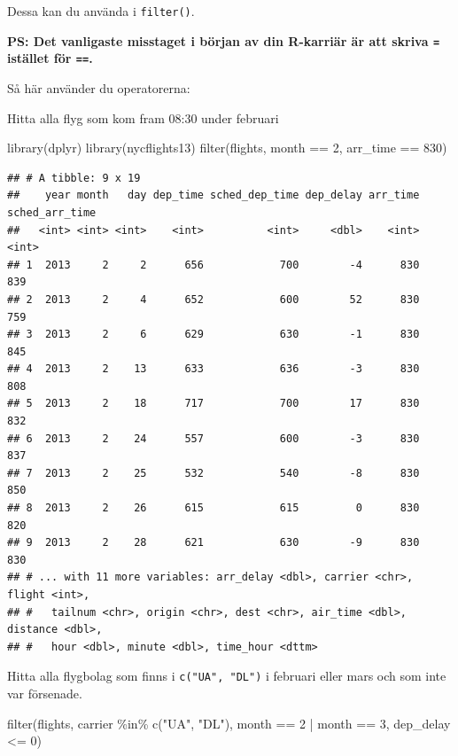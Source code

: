 \documentclass[
]{book}
\newenvironment{Shaded}{\begin{snugshade}}{\end{snugshade}}
\newcommand{\DecValTok}[1]{\textcolor[rgb]{0.00,0.00,0.81}{#1}}
\newcommand{\FunctionTok}[1]{\textcolor[rgb]{0.00,0.00,0.00}{#1}}
\newcommand{\NormalTok}[1]{#1}
\newcommand{\SpecialCharTok}[1]{\textcolor[rgb]{0.00,0.00,0.00}{#1}}
\newcommand{\StringTok}[1]{\textcolor[rgb]{0.31,0.60,0.02}{#1}}
\begin{document}
Dessa kan du använda i \texttt{filter()}.

\textbf{PS: Det vanligaste misstaget i början av din R-karriär är att skriva \texttt{=} istället för \texttt{==}.}

Så här använder du operatorerna:

Hitta alla flyg som kom fram 08:30 under februari

\begin{Shaded}
\begin{Highlighting}[]
\FunctionTok{library}\NormalTok{(dplyr)}
\FunctionTok{library}\NormalTok{(nycflights13)}
\FunctionTok{filter}\NormalTok{(flights, month }\SpecialCharTok{==} \DecValTok{2}\NormalTok{, arr\_time }\SpecialCharTok{==} \DecValTok{830}\NormalTok{)}
\end{Highlighting}
\end{Shaded}

\begin{verbatim}
## # A tibble: 9 x 19
##    year month   day dep_time sched_dep_time dep_delay arr_time sched_arr_time
##   <int> <int> <int>    <int>          <int>     <dbl>    <int>          <int>
## 1  2013     2     2      656            700        -4      830            839
## 2  2013     2     4      652            600        52      830            759
## 3  2013     2     6      629            630        -1      830            845
## 4  2013     2    13      633            636        -3      830            808
## 5  2013     2    18      717            700        17      830            832
## 6  2013     2    24      557            600        -3      830            837
## 7  2013     2    25      532            540        -8      830            850
## 8  2013     2    26      615            615         0      830            820
## 9  2013     2    28      621            630        -9      830            830
## # ... with 11 more variables: arr_delay <dbl>, carrier <chr>, flight <int>,
## #   tailnum <chr>, origin <chr>, dest <chr>, air_time <dbl>, distance <dbl>,
## #   hour <dbl>, minute <dbl>, time_hour <dttm>
\end{verbatim}

Hitta alla flygbolag som finns i \texttt{c("UA",\ "DL")} i februari eller mars och som inte var försenade.

\begin{Shaded}
\begin{Highlighting}[]
\FunctionTok{filter}\NormalTok{(flights, carrier }\SpecialCharTok{\%in\%} \FunctionTok{c}\NormalTok{(}\StringTok{"UA"}\NormalTok{, }\StringTok{"DL"}\NormalTok{), month }\SpecialCharTok{==} \DecValTok{2} \SpecialCharTok{|}\NormalTok{ month }\SpecialCharTok{==} \DecValTok{3}\NormalTok{, dep\_delay }\SpecialCharTok{\textless{}=} \DecValTok{0}\NormalTok{)}
\end{Highlighting}
\end{Shaded}
\end{document}

